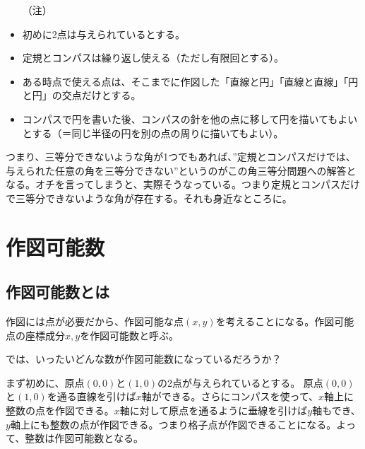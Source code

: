 \begin{itemize}
\item[{\gt （注）}]
\item 初めに2点は与えられているとする。
\item 定規とコンパスは繰り返し使える（ただし有限回とする）。
\item ある時点で使える点は、そこまでに作図した「直線と円」「直線と直線」「円と円」の交点だけとする。
\item コンパスで円を書いた後、コンパスの針を他の点に移して円を描いてもよいとする（＝同じ半径の円を別の点の周りに描いてもよい）。
\end{itemize}

つまり、三等分できないような角が1つでもあれば、”定規とコンパスだけでは、与えられた任意の角を三等分{\gt できない}”というのがこの角三等分問題への解答となる。オチを言ってしまうと、実際そうなっている。つまり定規とコンパスだけで三等分できないような角が存在する。それも身近なところに。

%
\section{作図可能数}

\subsection{作図可能数とは}
作図には{\gt 点}が必要だから、{\gt 作図可能な点}$(x,y)$を考えることになる。作図可能点の座標成分$x,y$を{\gt 作図可能数}と呼ぶ。\par
では、いったいどんな数が作図可能数になっているだろうか？\par
まず初めに、原点$(0,0)$と$(1,0)$の2点が与えられているとする。
原点$(0,0)$と$(1,0)$を通る直線を引けば$x$軸ができる。さらにコンパスを使って、$x$軸上に整数の点を作図できる。$x$軸に対して原点を通るように垂線を引けば$y$軸もでき、$y$軸上にも整数の点が作図できる。つまり格子点が作図できることになる。よって、{\gt 整数は作図可能数}となる。

\newpage
